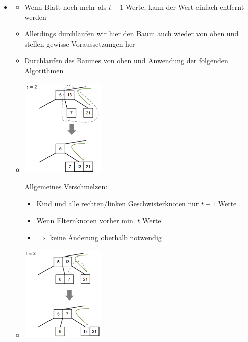 \documentclass[
    12pt,
    a4paper,
    ngerman,
    color=3b,%
    marginpar=false,
    colorback=false,
    leqno,
]{tudaexercise}
\begin{document}
\begin{itemize}
        \item {}
            \begin{itemize}
                \item Wenn Blatt noch mehr als $t-1$ Werte, kann der Wert einfach entfernt werden
                \item Allerdings durchlaufen wir hier den Baum auch wieder von oben und stellen gewisse Voraussetzungen her
                \item Durchlaufen des Baumes von oben und Anwendung der folgenden Algorithmen
                \item[]
                    \begin{minipage}{0.25\textwidth}
                        \includegraphics[width=4cm]{pictures/bbaumMelt.PNG}
                    \end{minipage}
                    \begin{minipage}{0.65\textwidth}
                        Allgemeines Verschmelzen:
                        \begin{itemize}
                            \item Kind und alle rechten/linken Geschwisterknoten nur $t-1$ Werte
                            \item Wenn Elternknoten vorher min. $t$ Werte
                            \item[] $\Rightarrow$ keine Änderung oberhalb notwendig
                        \end{itemize}
                    \end{minipage}
                \item[]
                    \begin{minipage}{0.25\textwidth}
                        \includegraphics[width=4cm]{pictures/bbaumRot.PNG}

\end{minipage}
\end{itemize}
\end{itemize}
\end{document}
